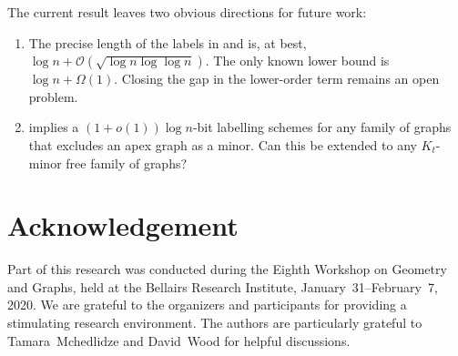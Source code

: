 \documentclass[10pt, conference, compsocconf]{IEEEtran}
\newcommand{\Oh}{\mathcal{O}}
\begin{document}
The current result leaves two obvious directions for future work:
\begin{enumerate}

\item The precise length of the labels in  and  is, at best, $\log{n} + \Oh(\sqrt{\log{n}\log\log{n}})$. The only known lower bound is $\log{n} + \Omega(1)$. Closing the gap in the lower-order term remains an open problem.

\item {} implies a $(1+o(1))\log{n}$-bit labelling schemes for any family of graphs that excludes an apex graph as a minor.  Can this be extended to any $K_t$-minor free family of graphs?

\end{enumerate}

\section*{Acknowledgement}

Part of this research was conducted during the Eighth Workshop on Geometry and Graphs, held at the Bellairs Research Institute, January~31--February~7, 2020.  We are grateful to the organizers and participants for providing a stimulating research environment.  The authors are particularly grateful to Tamara~Mchedlidze and David~Wood for helpful discussions.









\end{document}
